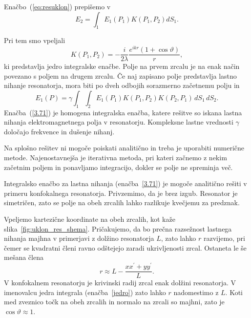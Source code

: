 Enačbo~(\ref{eq:resuklon}) prepišemo v 
\begin{equation}
E_2 =  \int_{1}E_{1}(P_{1})K(P_{1},P_{2})dS_{1}.
\end{equation}

Pri tem smo vpeljali
\begin{equation}
K(P_{1},P_{2}) = -\frac{i}{2\lambda}\frac{e^{ikr}(1+\cos\vartheta)}{r},
\label{jedro}
\end{equation}
ki predstavlja jedro integralske enačbe. Polje na prvem zrcalu je 
na enak način povezano s poljem na drugem zrcalu. Če naj zapisano polje predstavlja lastno nihanje
resonatorja, mora biti po dveh odbojih sorazmerno začetnemu polju in
\begin{equation}
E_{1}(P)=\gamma\int_{1}\int_{2}E_{1}(P_{1})K(P_{1},P_{2})K(P_{2},P_1)\, dS_{1}\, dS_{2}.
\label{3.71}
\end{equation}
Enačba~(\ref{3.71}) je homogena integralska enačba, katere
rešitve so iskana lastna nihanja elektromagnetnega polja v resonatorju.
Kompleksne lastne vrednosti $\gamma$ določajo frekvence in dušenje
nihanj. 

Na splošno rešitev ni mogoče poiskati analitično in treba je uporabiti 
numerične metode. Najenostavnejša je iterativna
metoda, pri kateri začnemo z nekim začetnim poljem in ponavljamo integracijo, 
dokler se polje ne spreminja več.

Integralsko enačbo za lastna nihanja (enačba~\ref{3.71}) je mogoče analitično rešiti v primeru
konfokalnega resonatorja. Privzemimo, da je brez izgub. 
Resonator je simetričen, zato se polje na obeh zrcalih lahko razlikuje kvečjemu
za predznak.

Vpeljemo kartezične koordinate na obeh zrcalih, kot kaže slika~\ref{fig:uklon_res_shema}.
Pričakujemo, da bo prečna razsežnost lastnega nihanja majhna v primerjavi
z dolžino resonatorja $L$, zato lahko $r$ razvijemo, pri čemer se kvadratni členi ravno odštejejo 
zaradi ukrivljenosti zrcal. Ostaneta le še mešana člena
\begin{equation}
r\approx L-\frac{xx^{\prime}+yy^{\prime}}{L}.
\label{3.72}
\end{equation}
V konfokalnem resonatorju je krivinski radij zrcal enak dolžini resonatorja.
V imenovalcu jedra integrala (enačba~\ref{jedro}) zato lahko $r$ nadomestimo
z $L$. Koti med zveznico točk na obeh zrcalih in normalo na zrcali
so majhni, zato je  $\cos\vartheta \approx 1$. 

